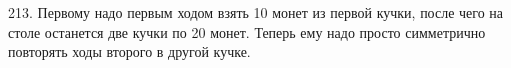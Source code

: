 213. Первому надо первым ходом взять 10 монет из первой кучки, после чего на столе останется две кучки по 20 монет. Теперь ему надо просто симметрично повторять ходы второго в другой кучке.\\
